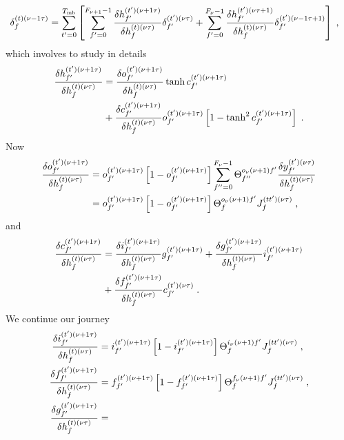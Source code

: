 \begin{subappendices}
\begin{align}
\delta^{(t)(\nu-1\tau)}_f&= \sum_{t'=0}^{T_{{\rm mb}}}\left[\sum_{f'=0}^{F_{\nu+1}-1}
%
\frac{\delta h^{(t')(\nu+1\tau)}_{f'}}{\delta h^{(t)(\nu\tau)}_f }\delta^{(t')(\nu\tau)}_{f'}
%
+\sum_{f'=0}^{F_{\nu}-1}\frac{\delta h^{(t')(\nu\tau+1)}_{f'}}{\delta h^{(t)(\nu\tau)}_f }\delta^{(t')(\nu-1\tau+1)}_{f'}\right]\;,
\end{align}
which involves to study in details
\begin{align}
\frac{\delta h^{(t')(\nu+1\tau)}_{f'}}{\delta h^{(t)(\nu\tau)}_f }&=
%
\frac{\delta o^{(t')(\nu+1\tau)}_{f'}}{\delta h^{(t)(\nu\tau)}_f }\tanh  c^{(t')(\nu+1\tau)}_{f'}\notag\\
%
&+\frac{\delta c^{(t')(\nu+1\tau)}_{f'}}{\delta h^{(t)(\nu\tau)}_f } o^{(t')(\nu+1\tau)}_{f'}
%
\left[1-\tanh^2  c^{(t')(\nu+1\tau)}_{f'}\right]\;.
\end{align}
Now
\begin{align}
\frac{\delta o^{(t')(\nu+1\tau)}_{f'}}{\delta h^{(t)(\nu\tau)}_f }&=o^{(t')(\nu+1\tau)}_{f'}
%
\left[1-o^{(t')(\nu+1\tau)}_{f'}\right]\sum_{f''=0}^{F_\nu-1}\Theta^{o_\nu(\nu+1)f'}_{f''}
%
\frac{\delta y^{(t')(\nu\tau)}_{f'}}{\delta h^{(t)(\nu\tau)}_f }\notag\\
%
&=o^{(t')(\nu+1\tau)}_{f'}
%
\left[1-o^{(t')(\nu+1\tau)}_{f'}\right]\Theta^{o_\nu(\nu+1)f'}_{f}
%
J^{(tt')(\nu\tau)}_f\;,
\end{align}
and
\begin{align}
\frac{\delta c^{(t')(\nu+1\tau)}_{f'}}{\delta h^{(t)(\nu\tau)}_f }&=
%
\frac{\delta i^{(t')(\nu+1\tau)}_{f'}}{\delta h^{(t)(\nu\tau)}_f }g^{(t')(\nu+1\tau)}_{f'}
%
+\frac{\delta g^{(t')(\nu+1\tau)}_{f'}}{\delta h^{(t)(\nu\tau)}_f }i^{(t')(\nu+1\tau)}_{f'}\notag\\
%
&+\frac{\delta f^{(t')(\nu+1\tau)}_{f'}}{\delta h^{(t)(\nu\tau)}_f }c^{(t')(\nu\tau)}_{f'}\;.
\end{align}
We continue our journey
\begin{align}
\frac{\delta i^{(t')(\nu+1\tau)}_{f'}}{\delta h^{(t)(\nu\tau)}_f }&=
%
 i^{(t')(\nu+1\tau)}_{f'}\left[1-  i^{(t')(\nu+1\tau)}_{f'}\right]\Theta^{i_\nu(\nu+1)f'}_{f}
%
J^{(tt')(\nu\tau)}_f\;,\notag\\
%
\frac{\delta f^{(t')(\nu+1\tau)}_{f'}}{\delta h^{(t)(\nu\tau)}_f }&=
%
 f^{(t')(\nu+1\tau)}_{f'}\left[1-  f^{(t')(\nu+1\tau)}_{f'}\right]\Theta^{f_\nu(\nu+1)f'}_{f}
%
J^{(tt')(\nu\tau)}_f\;,\notag\\
%
\frac{\delta g^{(t')(\nu+1\tau)}_{f'}}{\delta h^{(t)(\nu\tau)}_f }&=

\end{align}
\end{subappendices}
